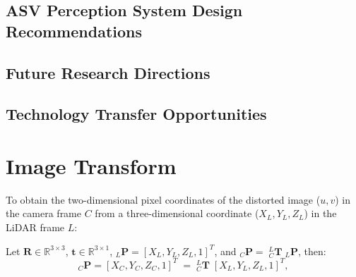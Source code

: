 \documentclass{erauthesis}
\begin{document}

\section{ASV Perception System Design Recommendations}

\section{Future Research Directions}

\section{Technology Transfer Opportunities}




% 


\backmatter


\chapter{Image Transform} \label{img_tform}


To obtain the two-dimensional pixel coordinates of the distorted image ($u, v$) in the camera frame $C$ from a three-dimensional coordinate ($X_{L}, Y_L, Z_L$) in the LiDAR frame $L$:

Let $\mathbf{R}\in \mathbb{R}^{3\times3}$, $\mathbf{t}\in \mathbb{R}^{3\times1}$, $_L\mathbf{P} = [X_L, Y_L, Z_L, 1]^T$,  and $_C\mathbf{P} = \;_{C}^{L}\mathbf{T} \; _L\mathbf{P}$, then:
\begin{equation*}
_C\mathbf{P} = [X_C, Y_C, Z_C, 1]^T \;= \; _{C}^{L}\mathbf{T} \;[X_L, Y_L, Z_L, 1]^T,
\end{equation*}
\end{document}
